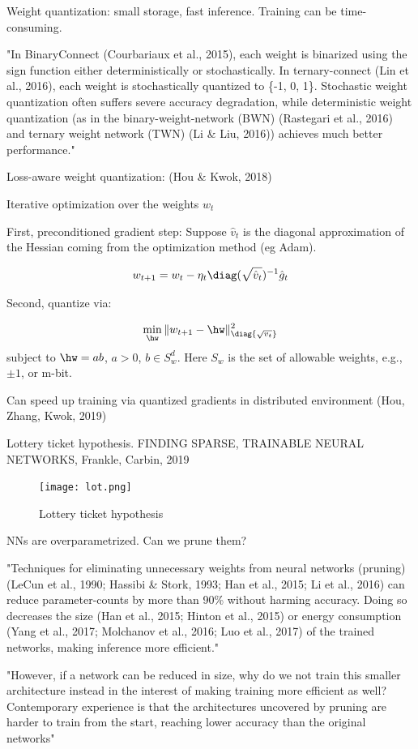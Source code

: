 \documentclass[english]{article}
\begin{document}
Weight quantization: small storage, fast inference. Training can be time-consuming. 

"In BinaryConnect (Courbariaux et al., 2015), each weight is binarized using the sign function either
deterministically or stochastically. In ternary-connect (Lin et al., 2016), each weight is stochastically
quantized to \{-1, 0, 1\}. Stochastic weight quantization often suffers severe accuracy degradation,
while deterministic weight quantization (as in the binary-weight-network (BWN) (Rastegari et al.,
2016) and ternary weight network (TWN) (Li \& Liu, 2016)) achieves much better performance."


Loss-aware weight quantization: (Hou \& Kwok, 2018)

Iterative optimization over the weights $w_t$

First, preconditioned gradient step: Suppose $\hat v_t$ is the diagonal approximation of the Hessian coming from the optimization method (eg Adam).

$$w_{t+1} = w_t - \eta_t \diag(\sqrt{\hat v_t})^{-1}\hat g_t$$

Second, quantize via: 

$$\min_{\hw}\| w_{t+1} - \hw \|^2_{\diag{\sqrt{v_t}}}$$ subject to $\hw = ab$, $a>0$, $b\in S_w^d$. Here $S_w$ is the set of allowable weights, e.g., $\pm 1$, or m-bit.


Can speed up training via quantized gradients in distributed environment (Hou, Zhang, Kwok, 2019)

\item Lottery ticket hypothesis. FINDING SPARSE, TRAINABLE NEURAL NETWORKS, Frankle, Carbin, 2019

\begin{figure}
  \centering
  \texttt{[image: lot.png]}
  \caption{Lottery ticket hypothesis}
  \label{lot}
\end{figure}

NNs are overparametrized. Can we prune them?

"Techniques for eliminating unnecessary weights from neural networks (pruning) (LeCun et al., 1990;
Hassibi \& Stork, 1993; Han et al., 2015; Li et al., 2016) can reduce parameter-counts by more than
90\% without harming accuracy. Doing so decreases the size (Han et al., 2015; Hinton et al., 2015)
or energy consumption (Yang et al., 2017; Molchanov et al., 2016; Luo et al., 2017) of the trained
networks, making inference more efficient." 

"However, if a network can be reduced in size, why do we
not train this smaller architecture instead in the interest of making training more efficient as well?
Contemporary experience is that the architectures uncovered by pruning are harder to train from the
start, reaching lower accuracy than the original networks"
\end{document}
